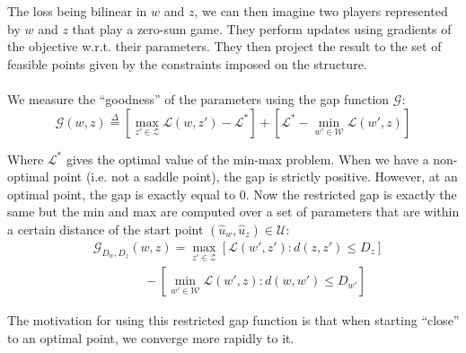 \documentclass{article}
\begin{document}
The loss being bilinear in $w$ and $z$, we can then imagine two players represented by
$ w$ and $ z$ that play a zero-sum game. They perform updates using gradients of
the objective w.r.t. their parameters. They then project the result to the set
of feasible points given by the constraints imposed on the structure.\\ 
\\
We measure the ``goodness'' of the parameters using the gap function
$\mathcal{G}$:
\begin{equation}
  \mathcal{G}( w,  z) \overset{\Delta}{=}\left[ \max_{ z' \in \mathcal{Z}}
\mathcal{L}( w, z') - \mathcal{L}^* \right] + \left[ \mathcal{L}^* -
\min_{ w' \in \mathcal{W}} \mathcal{L}( w',  z) \right]
\end{equation}

Where $\mathcal{L}^*$ gives the optimal value of the min-max problem. When we have a non-optimal point (i.e. not a saddle point), the gap is strictly positive. However, at an optimal point, the gap is exactly equal to $0$.
Now the restricted gap is exactly the same but the min and max are computed over a set of parameters that are within a certain distance of the start point
$(\hat{ u}_{ w},\hat{ u}_{ z}) \in \mathcal{U}$:
\begin{equation}
\begin{aligned}
    &\mathcal{G}_{D_{ w}, D_{ z}}( w,  z) = \max_{ z' \in \mathcal{Z}} \left[ \mathcal{L}( w',  z') : d( z,  z') \leq D_{ z} \right]\\
    &\quad\quad\quad\quad-\left [ \min_{ w' \in \mathcal{W}} \mathcal{L}( w', z) : d( w,  w') \leq D_{ w'} \right ]
\end{aligned}
\end{equation}

The motivation for using this restricted gap function is that when starting ``close'' to an optimal point, we converge more rapidly to it.
\end{document}
